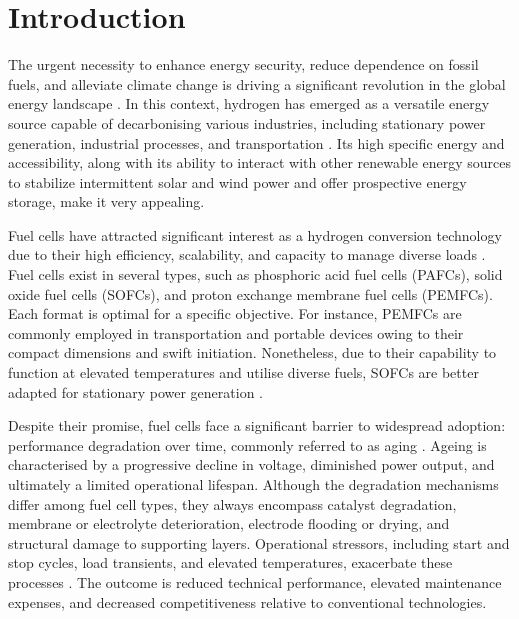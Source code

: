 \chapter{Introduction}
\label{sec:intro}



The urgent necessity to enhance energy security, reduce dependence on fossil fuels, and alleviate climate change is driving a significant revolution in the global energy landscape \cite{IEA2019Hydrogen,IEA2022GlobalHydrogen,Staffell2019HydrogenReview,HydrogenCouncil2020Report,IRENA2022Hydrogen}.   In this context, hydrogen has emerged as a versatile energy source capable of decarbonising various industries, including stationary power generation, industrial processes, and transportation \cite{IEA2022GlobalHydrogen,HydrogenCouncil2020Report}. Its high specific energy and accessibility, along with its ability to interact with other renewable energy sources to stabilize intermittent solar and wind power and offer prospective energy storage, make it very appealing\cite{Staffell2019HydrogenReview,IEA2022GlobalHydrogen,Levi2019HydrogenStorage}.

Fuel cells have attracted significant interest as a hydrogen conversion technology due to their high efficiency, scalability, and capacity to manage diverse loads \cite{Steele2001Nature,Barbir2013PEMFCReview}. Fuel cells exist in several types, such as phosphoric acid fuel cells (PAFCs), solid oxide fuel cells (SOFCs), and proton exchange membrane fuel cells (PEMFCs). Each format is optimal for a specific objective. For instance, PEMFCs are commonly employed in transportation and portable devices owing to their compact dimensions and swift initiation. Nonetheless, due to their capability to function at elevated temperatures and utilise diverse fuels, SOFCs are better adapted for stationary power generation \cite{IEA2019Hydrogen,HydrogenCouncil2020Report,IEA2022GlobalHydrogen}.

Despite their promise, fuel cells face a significant barrier to widespread adoption: performance degradation over time, commonly referred to as aging \cite{Wang2011ReviewDurability,Borup2007CR,Song2019Review}. Ageing is characterised by a progressive decline in voltage, diminished power output, and ultimately a limited operational lifespan. Although the degradation mechanisms differ among fuel cell types, they always encompass catalyst degradation, membrane or electrolyte deterioration, electrode flooding or drying, and structural damage to supporting layers\cite{Wang2011ReviewDurability,Song2019Review,Li2018MembraneReview}. Operational stressors, including start and stop cycles, load transients, and elevated temperatures, exacerbate these processes \cite{Borup2007CR,Dubau2014WIRES}. The outcome is reduced technical performance, elevated maintenance expenses, and decreased competitiveness relative to conventional technologies\cite{Humphreys2020Prognostics,HydrogenCouncil2020Report}.

